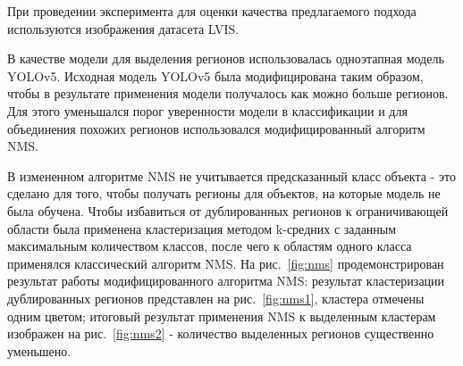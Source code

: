 \documentclass[a4paper,14pt]{article}
\begin{document}
    При проведении эксперимента для оценки качества предлагаемого подхода используются изображения датасета LVIS. 
    
    В качестве модели для выделения регионов использовалась одноэтапная модель YOLOv5. 
    Исходная модель YOLOv5 была модифицирована таким образом, чтобы в результате применения модели получалось как можно больше регионов. 
    Для этого уменьшался порог уверенности модели в классификации и для объединения похожих регионов использовался модифицированный алгоритм NMS. 
    
    В измененном алгоритме NMS не учитывается предсказанный класс объекта - это сделано для того, чтобы получать регионы  для объектов, на которые модель не была обучена. 
    Чтобы избавиться от дублированных регионов к ограничивающей области была применена кластеризация методом k-средних с заданным максимальным количеством классов, после чего к областям одного класса применялся классический алгоритм NMS. 
    На рис.~\ref{fig:nms} продемонстрирован результат работы модифицированного алгоритма NMS: результат кластеризации дублированных регионов представлен на рис.~\ref{fig:nms1}, кластера отмечены одним цветом; итоговый результат применения NMS к выделенным кластерам изображен на рис.~\ref{fig:nms2} - количество выделенных регионов существенно уменьшено.
    
\end{document}
